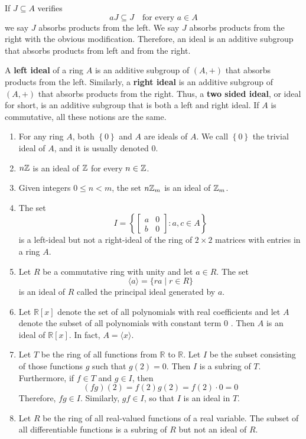 \documentclass[11pt,a4paper]{article}
\begin{document}
If \(J\subseteq A\) verifies 
\[a J \subseteq J\quad\text{for every }a\in A\]
we say \(J\) absorbs products from the left.
We say \(J\) absorbs products from the right with the obvious modification.
Therefore, an ideal is an additive subgroup that absorbs products from left and from the right.

\begin{rem}
    A \textbf{left ideal} of a ring \(A\) is an additive subgroup of \((A,+)\) that absorbs products from the left.
    Similarly,
    a \textbf{right ideal}  is an additive subgroup of \((A,+)\) that absorbs products from the right.
    Thus, a \textbf{two sided ideal}, or ideal for short,
    is an additive subgroup that is both a left and right ideal.
    If \(A\) is commutative, all these notions are the same.
\end{rem}

\begin{exa}
\begin{enumerate}[label=(\roman*)]
\item For any ring \(A\), both \(\left\{ 0 \right\} \) and \(A\) are ideals of \(A\). We call \(\left\{ 0 \right\}\) the trivial ideal of \(A\), and it is usually denoted \(0\).
\item \(n\mathbb{Z}\) is an ideal of \(\mathbb{Z}\) for every \(n\in \mathbb{Z}\).
\item Given integers \(0\leq n < m\), the set \(n \mathbb{Z}_m\) is an ideal of \(\mathbb{Z}_m\).
\item The set  $$I=\left\{\left[\begin{array}{ll}a & 0 \\ b & 0\end{array}\right]: a, c \in A\right\}$$
is a left-ideal but not a right-ideal of the ring of \(2\times 2\) matrices with entries in a ring \(A\).
\item Let $R$ be a commutative ring with unity and let $a \in R$. The set $$\langle a\rangle=\{r a \mid r \in R\}$$ is an ideal of $R$ called the principal ideal generated by $a$.  
\item  Let $\mathbb{R}[x]$ denote the set of all polynomials with real coefficients and let $A$ denote the subset of all polynomials with constant term 0 . Then $A$ is an ideal of $\mathbb{R}[x]$. In fact, $A=\langle x\rangle$.

\item Let $T$ be the ring of all functions from $\mathbb{R}$ to $\mathbb{R}$. Let $I$ be the subset consisting of those functions $g$ such that $g(2)=0$. Then $I$ is a subring of $T$. Furthermore, if $f\in T$   and   $g \in I$, then
\[
(f g)(2)=f(2) g(2)=f(2) \cdot 0=0
\]
Therefore, $f g \in I$. Similarly, $g f \in I$, so that $I$ is an ideal in $T$.

\item  Let $R$ be the ring of all real-valued functions of a real variable. The subset  of all differentiable functions is a subring of $R$ but not an ideal of $R$.
\end{enumerate}
\end{exa}
\end{document}
